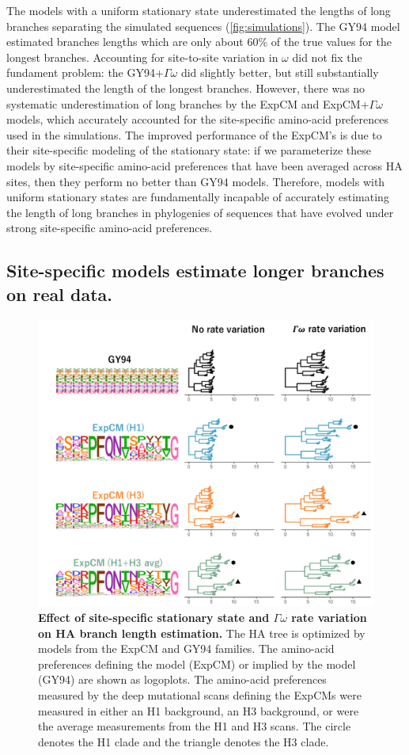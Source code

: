 \documentclass[11pt]{article}
\begin{document}
The models with a uniform stationary state underestimated the lengths of long branches separating the simulated sequences (\ref{fig:simulations}). 
The GY94 model estimated branches lengths which are only about 60\% of the true values for the longest branches. 
Accounting for site-to-site variation in $\omega$ did not fix the fundament problem: the GY94+$\Gamma\omega$ did slightly better, but still substantially underestimated the length of the longest branches.
However, there was no systematic underestimation of long branches by the ExpCM and ExpCM+$\Gamma\omega$ models, which accurately accounted for the site-specific amino-acid preferences used in the simulations.
The improved performance of the ExpCM's is due to their site-specific modeling of the stationary state: if we parameterize these models by site-specific amino-acid preferences that have been averaged across HA sites, then they perform no better than GY94 models.
Therefore, models with uniform stationary states are fundamentally incapable of accurately estimating the length of long branches in phylogenies of sequences that have evolved under strong site-specific amino-acid preferences.


\subsection*{Site-specific models estimate longer branches on real data.}

\begin{figure}
\centerline{\includegraphics[width=\textwidth]{figures/empirical_trees.pdf}}
\caption{\label{fig:empirical_trees}
\textbf{Effect of site-specific stationary state and $\Gamma\omega$ rate variation on HA branch length estimation.} 
The HA tree is optimized by models from the ExpCM and GY94 families. 
The amino-acid preferences defining the model (ExpCM) or implied by the model (GY94) are shown as logoplots. 
The amino-acid preferences measured by the deep mutational scans defining the ExpCMs were measured in either an H1 background, an H3 background, or were the average measurements from the H1 and H3 scans. 
The circle denotes the H1 clade and the triangle denotes the H3 clade. 
}
\end{figure}
\end{document}
